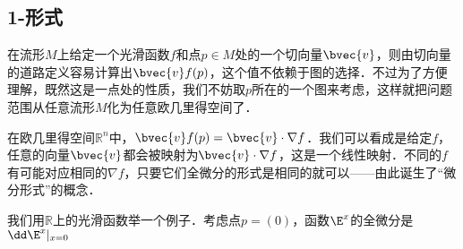 

\subsection{1-形式}

在流形$M$上给定一个光滑函数$f$和点$p\in M$处的一个切向量$\bvec{v}$，则由切向量的道路定义容易计算出$\bvec{v}f(p)$，这个值不依赖于图的选择．不过为了方便理解，既然这是一点处的性质，我们不妨取$p$所在的一个图来考虑，这样就把问题范围从任意流形$M$化为任意欧几里得空间了．

在欧几里得空间$\mathbb{R}^n$中，$\bvec{v}f(p)=\bvec{v}\cdot\nabla f$．我们可以看成是给定$f$，任意的向量$\bvec{v}$都会被映射为$\bvec{v}\cdot\nabla f$，这是一个线性映射．不同的$f$有可能对应相同的$\nabla f$，只要它们全微分的形式是相同的就可以——由此诞生了“微分形式”的概念．

我们用$\mathbb{R}$上的光滑函数举一个例子．考虑点$p=(0)$，函数$\E^x$的全微分是$\dd\E^x|_{x=0}$




